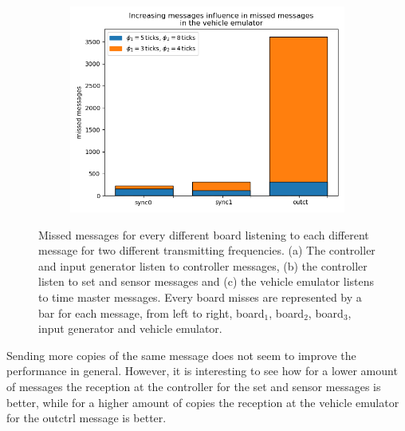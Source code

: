 \documentclass[table,xcdraw]{article}
\begin{document}
\begin{figure}[h!]
\begin{subfigure}[b]{0.4\textwidth}
         \centering
         \includegraphics[width=\textwidth]{figures/missing_msgs/missed_msgs_IncrMsgs_vem.png}
         \caption{}
     \end{subfigure}
        \caption{Missed messages for every different board listening to each different message for two different transmitting frequencies. (a) The controller and input generator listen to controller messages, (b) the controller listen to set and sensor messages and (c) the vehicle emulator listens to time master messages. Every board misses are represented by a bar for each message, from left to right, board$_1$, board$_2$, board$_3$, input generator and vehicle emulator.}
        \label{fig:mss_msgs_incr}
\end{figure}

Sending more copies of the same message does not seem to improve the performance in general. However, it is interesting to see how for a lower amount of messages the reception at the controller for the set and sensor messages is better, while for a higher amount of copies the reception at the vehicle emulator for the outctrl message is better.\\
\end{document}
